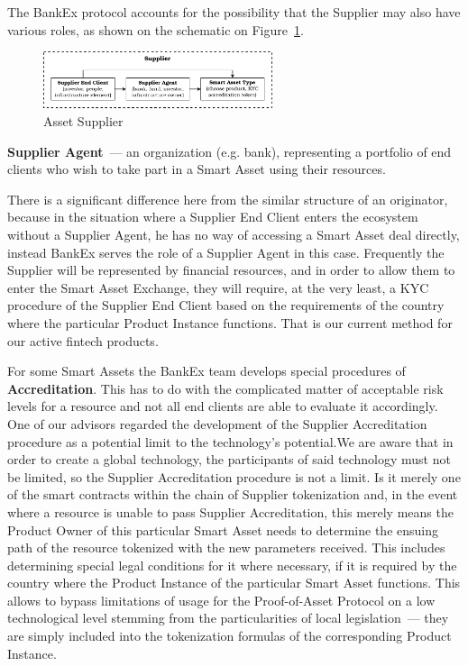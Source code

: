 \documentclass{article}
\begin{document}
\begin{multicols}{2}
The BankEx protocol accounts for the possibility that the Supplier may also have various roles, as shown on the schematic on Figure~\ref{fig:supplier}.

\begin{figure}
  \centering
  \includegraphics[width=0.6\textwidth]{supplier.pdf}
  \caption{Asset Supplier}
  \label{fig:supplier}
\end{figure}

\textbf{Supplier Agent}~--- an organization (e.g. bank), representing a portfolio of end clients who wish to take part in a Smart Asset using their resources.

There is a significant difference here from the similar structure of an originator, because in the situation where a Supplier End Client enters the ecosystem without a Supplier Agent, he has no way of accessing a Smart Asset deal directly, instead BankEx serves the role of a Supplier Agent in this case. Frequently the Supplier will be represented by financial resources, and in order to allow them to enter the Smart Asset Exchange, they will require, at the very least, a KYC procedure of the Supplier End Client based on the requirements of the country where the particular Product Instance functions. That is our current method for our active fintech products. 

For some Smart Assets the BankEx team develops special procedures of \textbf{Accreditation}. This has to do with the complicated matter of acceptable risk levels for a resource and not all end clients are able to evaluate it accordingly. One of our advisors regarded the development of the Supplier Accreditation procedure as a potential limit to the technology's potential.We are aware that in order to create a global technology, the participants of said technology must not be limited, so the Supplier Accreditation procedure is not a limit. Is it merely one of the smart contracts within the chain of Supplier tokenization and, in the event where a resource is unable to pass Supplier Accreditation, this merely means the Product Owner of this particular Smart Asset needs to determine the ensuing path of the resource tokenized with the new parameters received. This includes determining special legal conditions for it where necessary, if it is required by the country where the Product Instance of the particular Smart Asset functions. This allows to bypass limitations of usage for the Proof-of-Asset Protocol on a low technological level stemming from the particularities of local legislation~--- they are simply included into the tokenization formulas of the corresponding Product Instance.


\end{multicols}
\end{document}
